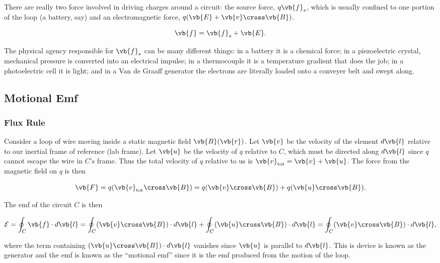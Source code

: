 \documentclass[english,a4paper,12pt]{report}
\begin{document}
There are really two force involved in driving charges around a circuit: the source force, \(q \vb{f} _{s}  \), which is usually confined to one portion of the loop (a battery, say) and an electromagnetic force, \(q(\vb{E} + \vb{v} \cross \vb{B} ) \).

\begin{equation}
    \vb{f} = \vb{f} _{s} + \vb{E} . 
\end{equation}

The physical agency responsible for \(\vb{f} _{s} \)  can be many different things: in a battery it is a chemical force; in a piezoelectric crystal, mechanical pressure is converted into an electrical impulse; in a thermocouple it is a temperature gradient that does the job; in a photoelectric cell it is light; and in a Van de Graaff generator the electrons are literally loaded onto a conveyer belt and swept along. 

\subsection{Motional Emf}
\subsubsection{Flux Rule}
Consider a loop of wire moving inside a static magnetic field \(\vb{B} (\vb{r} )\). Let \(\vb{v} \) be the velocity of the element \(d \vb{l} \) relative to our inertial frame of reference (lab frame). Let \(\vb{u}\) be the velocity of \(q\) relative to \(C\), which must be directed along \(d \vb{l} \) since \(q\) cannot escape the wire in \(C\)'s frame. Thus the total velocity of \(q\) relative to us is \(\vb{v} _{\text{tot} } = \vb{v} + \vb{u} \). The force from the magnetic field on \(q\) is then

\begin{equation}
    \vb{F} = q(\vb{v} _{\text{tot} } \cross \vb{B} ) = q (\vb{v} \cross \vb{B} ) + q (\vb{u} \cross \vb{B} ).
\end{equation}

The emf of the circuit \(C\) is then 

\begin{equation}
    \mathcal{E} = \oint_{C} \vb{f} \cdot d \vb{l} = \oint_{C} (\vb{v} \cross \vb{B} ) \cdot d \vb{l}  + \oint_{C} (\vb{u} \cross \vb{B} ) \cdot d \vb{l} = \oint_{C} (\vb{v} \cross \vb{B} ) \cdot d \vb{l} ,
\end{equation}

where the term containing \((\vb{u} \cross \vb{B} )\cdot d\vb{l} \) vanishes since \(\vb{u}\) is parallel to \(d \vb{l} \). This is device is known as the generator and the emf is known as the ``motional emf'' since it is the emf produced from the motion of the loop.
\end{document}
